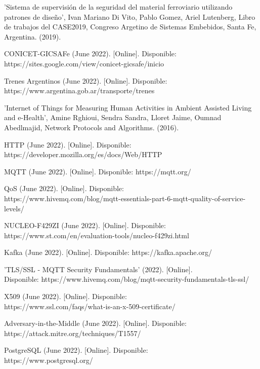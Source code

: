 \documentclass[a4paper]{IEEEtran}
\begin{document}
\balance
\begin{thebibliography}{00}

 'Sistema de supervisión de la seguridad del material
ferroviario utilizando patrones de diseño', Ivan Mariano Di Vito, Pablo Gomez, Ariel Lutenberg, Libro de trabajos del CASE2019, Congreso Argetino de Sistemas Embebidos, Santa Fe, Argentina. (2019).

 CONICET-GICSAFe (June 2022). [Online]. Disponible: \\ https://sites.google.com/view/conicet-gicsafe/inicio

 Trenes Argentinos (June 2022). [Online]. Disponible: \\ https://www.argentina.gob.ar/transporte/trenes 

 'Internet of Things for Measuring Human Activities in Ambient Assisted Living and e-Health', Amine Rghioui, Sendra Sandra, Lloret Jaime, Oumnad Abedlmajid,
Network Protocols and Algorithms. (2016).

 HTTP (June 2022). [Online]. Disponible: \\ https://developer.mozilla.org/es/docs/Web/HTTP 

 MQTT (June 2022). [Online]. Disponible: https://mqtt.org/ 

 QoS (June 2022). [Online]. Disponible: \\ https://www.hivemq.com/blog/mqtt-essentials-part-6-mqtt-quality-of-service-levels/

 NUCLEO-F429ZI (June 2022). [Online]. Disponible: \\ https://www.st.com/en/evaluation-tools/nucleo-f429zi.html

 Kafka (June 2022). [Online]. Disponible: https://kafka.apache.org/  

 'TLS/SSL - MQTT Security Fundamentals' (2022). [Online]. \\ Disponible: https://www.hivemq.com/blog/mqtt-security-fundamentals-tls-ssl/ 

 X509 (June 2022). [Online]. Disponible: \\ https://www.ssl.com/faqs/what-is-an-x-509-certificate/ 

 Adversary-in-the-Middle (June 2022). [Online]. Disponible: \\ https://attack.mitre.org/techniques/T1557/

 PostgreSQL (June 2022). [Online]. Disponible: \\ https://www.postgresql.org/


\end{thebibliography}
\end{document}
